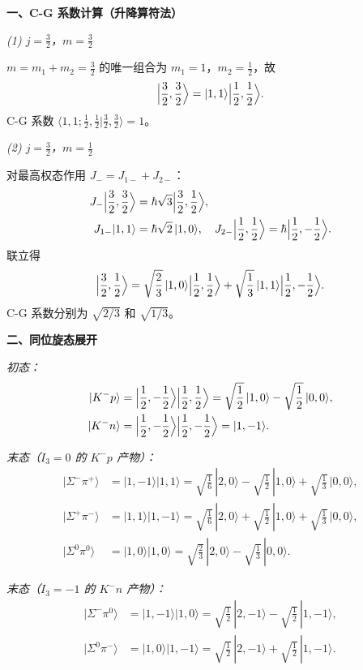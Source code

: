 \begin{derivationbox}[标准解题过程]
\textbf{一、C-G 系数计算（升降算符法）}

\textit{(1) $j=\frac32$，$m=\frac32$}

$m=m_1+m_2=\frac32$ 的唯一组合为 $m_1=1$，$m_2=\frac12$，故
\begin{equation}
\Bigl|\frac32,\frac32\Bigr\rangle=|1,1\rangle\Bigl|\frac12,\frac12\Bigr\rangle.
\end{equation}
C-G 系数 $\langle1,1;\frac12,\frac12|\frac32,\frac32\rangle=1$。

\textit{(2) $j=\frac32$，$m=\frac12$}

对最高权态作用 $J_-=J_{1-}+J_{2-}$：
\begin{align*}
J_-\Bigl|\frac32,\frac32\Bigr\rangle&=\hbar\sqrt3\Bigl|\frac32,\frac12\Bigr\rangle,\\
J_{1-}|1,1\rangle&=\hbar\sqrt2\,|1,0\rangle,\quad
J_{2-}\Bigl|\frac12,\frac12\Bigr\rangle=\hbar\Bigl|\frac12,-\frac12\Bigr\rangle.
\end{align*}
联立得
\begin{equation}
\Bigl|\frac32,\frac12\Bigr\rangle=\sqrt{\frac23}\,|1,0\rangle\Bigl|\frac12,\frac12\Bigr\rangle+\sqrt{\frac13}\,|1,1\rangle\Bigl|\frac12,-\frac12\Bigr\rangle.
\end{equation}
C-G 系数分别为 $\sqrt{2/3}$ 和 $\sqrt{1/3}$。

\textbf{二、同位旋态展开}

\textit{初态：}
\begin{align*}
|K^-p\rangle&=\Bigl|\frac12,-\frac12\Bigr\rangle\Bigl|\frac12,\frac12\Bigr\rangle
=\sqrt{\frac12}\,|1,0\rangle-\sqrt{\frac12}\,|0,0\rangle,\\
|K^-n\rangle&=\Bigl|\frac12,-\frac12\Bigr\rangle\Bigl|\frac12,-\frac12\Bigr\rangle=|1,-1\rangle.
\end{align*}

\textit{末态（$I_3=0$ 的 $K^-p$ 产物）：}
\begin{align*}
|\Sigma^-\pi^+\rangle&=|1,-1\rangle|1,1\rangle=\sqrt{\frac16}\,|2,0\rangle-\sqrt{\frac12}\,|1,0\rangle+\sqrt{\frac13}\,|0,0\rangle,\\
|\Sigma^+\pi^-\rangle&=|1,1\rangle|1,-1\rangle=\sqrt{\frac16}\,|2,0\rangle+\sqrt{\frac12}\,|1,0\rangle+\sqrt{\frac13}\,|0,0\rangle,\\
|\Sigma^0\pi^0\rangle&=|1,0\rangle|1,0\rangle=\sqrt{\frac23}\,|2,0\rangle-\sqrt{\frac13}\,|0,0\rangle.
\end{align*}

\textit{末态（$I_3=-1$ 的 $K^-n$ 产物）：}
\begin{align*}
|\Sigma^-\pi^0\rangle&=|1,-1\rangle|1,0\rangle=\sqrt{\frac12}\,|2,-1\rangle-\sqrt{\frac12}\,|1,-1\rangle,\\
|\Sigma^0\pi^-\rangle&=|1,0\rangle|1,-1\rangle=\sqrt{\frac12}\,|2,-1\rangle+\sqrt{\frac12}\,|1,-1\rangle.
\end{align*}


\end{derivationbox}
